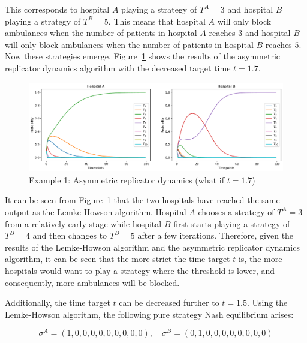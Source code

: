 This corresponds to hospital \(A\) playing a strategy of \(T^A = 3\) and
hospital \(B\) playing a strategy of \(T^B = 5\).
This means that hospital \(A\) will only block ambulances when the number of
patients in hospital \(A\) reaches \(3\) and hospital \(B\) will only block
ambulances when the number of patients in hospital \(B\) reaches \(5\).
Now 
these strategies emerge.
Figure~\ref{fig:asymmetric_replicator_dynamics_example_1_what_if_1} shows the
results of the asymmetric replicator dynamics algorithm with the decreased
target time \(t = 1.7\).

\begin{figure}[H]
    \centering
    \includegraphics[width=\linewidth]{chapters/05_numerical_results/Bin/example_1/what_if_t_1.7.pdf}
    \caption{Example 1: Asymmetric replicator dynamics (what if \(t = 1.7\))}
    \label{fig:asymmetric_replicator_dynamics_example_1_what_if_1}
\end{figure}

It can be seen from
Figure~\ref{fig:asymmetric_replicator_dynamics_example_1_what_if_1} that the
two hospitals have reached the same output as the Lemke-Howson algorithm.
Hospital \(A\) chooses a strategy of \(T^A=3\) from a relatively early stage
while hospital \(B\) first starts playing a strategy of \(T^B=4\) and then
changes to \(T^B=5\) after a few iterations.
Therefore, given the results of the Lemke-Howson algorithm and the asymmetric
replicator dynamics algorithm, it can be seen that the more strict the time
target \(t\) is, the more hospitals would want to play a strategy where the
threshold is lower, and consequently, more ambulances will be blocked.

Additionally, the time target \(t\) can be decreased further to \(t = 1.5\).
Using the Lemke-Howson algorithm, the following pure strategy Nash equilibrium
arises:

\begin{equation}
    \sigma^A = (1, 0, 0, 0, 0, 0, 0, 0, 0, 0), \quad
    \sigma^B = (0, 1, 0, 0, 0, 0, 0, 0, 0, 0)
\end{equation}

